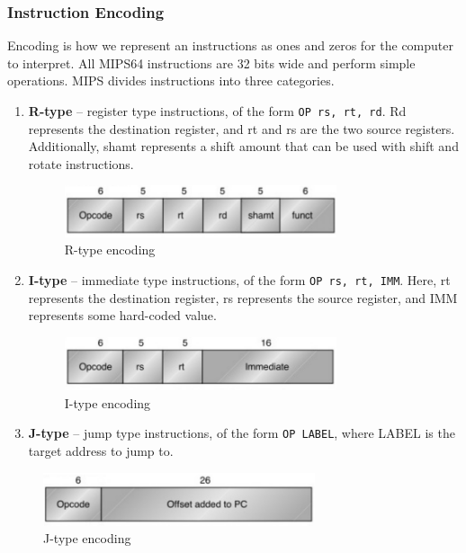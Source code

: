 \documentclass{article}
\begin{document}
\subsubsection{Instruction Encoding}

Encoding is how we represent an instructions as ones and zeros for the computer to interpret. All MIPS64 instructions are 32 bits wide and perform simple operations. MIPS divides instructions into three categories.

\begin{enumerate}
\item \textbf{R-type} -- register type instructions, of the form \texttt{OP rs, rt, rd}. Rd represents the destination register, and rt and rs are the two source registers. Additionally, shamt represents a shift amount that can be used with shift and rotate instructions.

\begin{figure}[ht!]
\centering
\includegraphics[width=80mm]{img/Rtype.png}
\caption{R-type encoding}
\end{figure}


\item \textbf{I-type} -- immediate type instructions, of the form \texttt{OP rs, rt, IMM}. Here, rt represents the destination register, rs represents the source register, and IMM represents some hard-coded value.

\begin{figure}[ht!]
\centering
\includegraphics[width=80mm]{img/Itype.png}
\caption{I-type encoding}
\end{figure}

\item \textbf{J-type} -- jump type instructions, of the form \texttt{OP LABEL}, where LABEL is the target address to jump to.
\end{enumerate}

\begin{figure}[ht!]
\centering
\includegraphics[width=80mm]{img/Jtype.png}
\caption{J-type encoding}
\end{figure}
\end{document}
